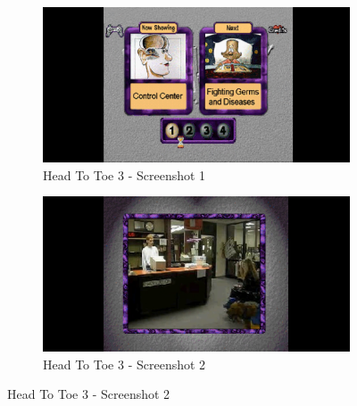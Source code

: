 \begin{figure}[H]
    \centering
    \begin{subfigure}{0.45\textwidth}
        \centering
        \includegraphics[width=\linewidth]{Games/HeadtoToe/Images/HeadToToe3Image1.png}
        \caption{Head To Toe 3 - Screenshot 1}
    \end{subfigure}
    \begin{subfigure}{0.45\textwidth}
        \includegraphics[width=\linewidth]{Games/HeadtoToe/Images/HeadToToe3Image2.png}
        \caption{Head To Toe 3 - Screenshot 2}
    \end{subfigure}


\end{figure}
